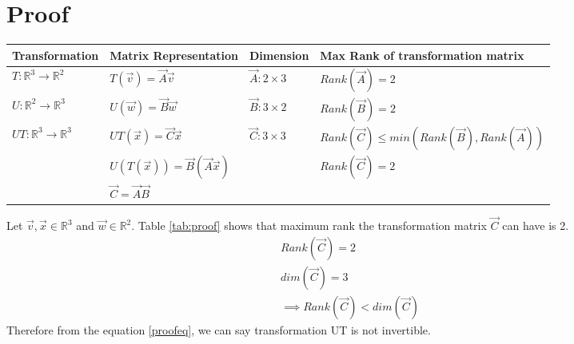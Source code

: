 \documentclass[journal,12pt,twocolumn]{IEEEtran}
\numberwithin{table}{section}
\begin{document}
\section{Proof}
\renewcommand{\thetable}{1}
\begin{table*}[h!]
\begin{center}
\begin{tabular}{|l|l|l|l|}
\hline
\textbf{Transformation}&\textbf{Matrix Representation}&\textbf{Dimension}&\textbf{Max Rank  of transformation matrix}\\[0.5ex]
\hline
$T:\mathbb{R}^3\rightarrow\mathbb{R}^2$ & $T(\vec{v})=\vec{A}\vec{v}$ & $\vec{A}:2\times 3$ & $Rank(\vec{A})=2$\\[0.5ex]
\hline
$U:\mathbb{R}^2\rightarrow\mathbb{R}^3$ & $U(\vec{w})=\vec{B}\vec{w}$ & $\vec{B}:3\times 2$ & $Rank(\vec{B})=2$\\[0.5ex]
\hline
$UT:\mathbb{R}^3\rightarrow\mathbb{R}^3$ & $UT(\vec{x})=\vec{C}\vec{x}$ & $\vec{C}:3\times 3$ & $Rank(\vec{C})\le min(Rank(\vec{B}),Rank(\vec{A}))$\\[0.5ex]
&$U(T(\vec{x}))=\vec{B}(\vec{A}\vec{x})$&&$Rank(\vec{C})=2$\\[0.5ex]
&$\vec{C}=\vec{A}\vec{B}$&&\\[0.5ex]
\hline
\end{tabular}
\caption{Proof for non-invertibility of the transformation UT where $T:\mathbb{R}^3\rightarrow\mathbb{R}^2$ and $U:\mathbb{R}^2\rightarrow\mathbb{R}^3$}
\label{tab:proof}
\end{center}
\vspace{0.5cm}
\end{table*}
Let $\vec{v},\vec{x}\in\mathbb{R}^3$ and $\vec{w}\in\mathbb{R}^2$. Table \ref{tab:proof} shows that maximum rank the transformation matrix $\vec{C}$ can have is 2. 
\begin{align}
Rank(\vec{C})=2\\
dim(\vec{C})=3\\
\implies Rank(\vec{C})<dim(\vec{C})\label{proofeq}
\end{align}
Therefore from the equation \eqref{proofeq}, we can say transformation UT is not invertible.
\end{document}
